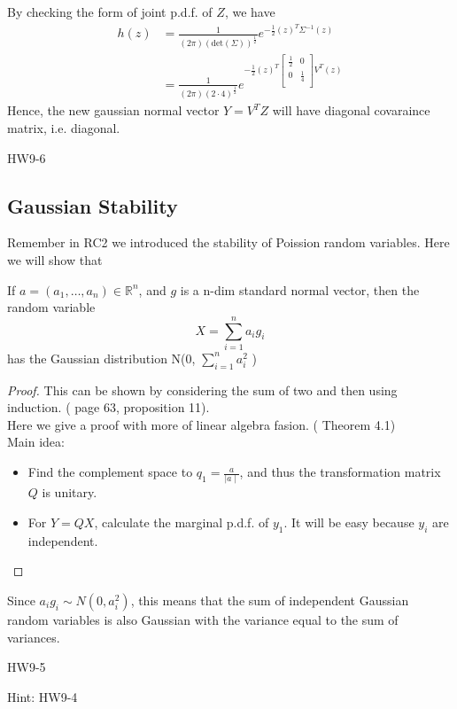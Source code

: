     By checking the form of joint p.d.f. of \(Z\), we have  
 \begin{equation}
    \begin{aligned}
    h(z) &= \frac{1}{(2\pi) (\text{det}(\Sigma) )^{\frac{1}{2}}} e^{-\frac{1}{2} (z)^T \Sigma ^{-1} (z) }
     \\ &= \frac{1}{(2\pi) (2 \cdot 4 )^{\frac{1}{2}}} e^{-\frac{1}{2} (z)^T \begin{bmatrix}
        \frac{1}{2} & 0  \\
        0 & \frac{1}{4}  \\
    \end{bmatrix} V^T (z) }
    \end{aligned}
 \end{equation}
 Hence, the new gaussian normal vector \(Y = V^T Z\) will have diagonal covaraince matrix, i.e. diagonal. 
   
\begin{exercise}
    HW9-6
\end{exercise}


\subsection*{Gaussian Stability}
Remember in RC2 we introduced the stability of Poission random variables.  Here we will show that
\begin{theorem}

If \(a = (a_1, \dots, a_n) \in \mathbb{R}^n\), and \(g\) is a n-dim standard normal vector, then the random variable 
\[
    X = \sum_{i=1}^{n} a_i g_i
\]
has the Gaussian distribution N(0, \(\sum_{i=1}^{n}a_i^2 \) )
\end{theorem} 
\begin{proof}
    This can be shown by considering the sum of two and then using induction. (\cite{Und_Chatterjee} page 63, proposition 11).\\ 
    Here we give a proof with more of linear algebra fasion. (\cite*{IntroPanchenko} Theorem 4.1)
    \\ Main idea:
    \begin{itemize}
        \item Find the complement space to \(q_1 = \frac{a}{\mid a\mid }\), and thus the transformation matrix \(Q\) is unitary.  
        \item For \(Y = QX\), calculate the marginal p.d.f. of \(y_1\). It will be easy because \(y_i\) are independent.   
    \end{itemize}
\end{proof}
Since \(a_{i}g_i \sim N(0,a_i^2) \), this means that the sum of independent
Gaussian random variables is also Gaussian with the
variance equal to the sum of variances.

\begin{exercise}
    HW9-5
\end{exercise}
Hint: HW9-4
